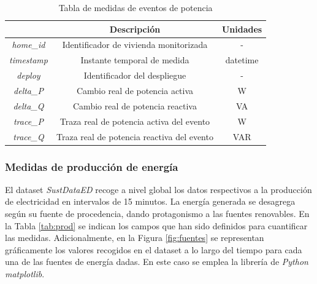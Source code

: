 \vspace{3mm}

\begin{table}[h!]
    \centering
    \begin{tabular}{|c|c|c|}
    \hline
    \rowcolor[HTML]{AAAAAA} 
    \multicolumn{1}{|c|}{\cellcolor[HTML]{AAAAAA}Campo} & \multicolumn{1}{c|}{\cellcolor[HTML]{AAAAAA}Descripción} & Unidades \\ \hline
    \textit{home\_id} & Identificador de vivienda monitorizada & - \\ \hline
    \textit{timestamp} & Instante temporal de medida & datetime \\ \hline
    \textit{deploy} & Identificador del despliegue & - \\ \hline
    \textit{delta\_P} & Cambio real de potencia activa & W \\ \hline
    \textit{delta\_Q} & Cambio real de potencia reactiva & VA \\ \hline
    \textit{trace\_P} & Traza real de potencia activa del evento & W \\ \hline
    \textit{trace\_Q} & Traza real de potencia reactiva del evento & VAR \\ \hline
    \end{tabular}
    \caption{Tabla de medidas de eventos de potencia \cite{sustdata}}
    \label{tab:eventos}
\end{table}

\subsubsection{Medidas de producción de energía}
\label{sec:prodsustdata}

El dataset \textit{SustDataED} recoge a nivel global los datos respectivos a la producción de electricidad en intervalos de 15 minutos. La energía generada se desagrega según su fuente de procedencia, dando protagonismo a las fuentes renovables. En la Tabla \ref{tab:prod} se indican los campos que han sido definidos para cuantificar las medidas. Adicionalmente, en la Figura \ref{fig:fuentes} se representan gráficamente los valores recogidos en el dataset a lo largo del tiempo para cada una de las fuentes de energía dadas. En este caso se emplea la librería de \textit{Python} \textit{matplotlib}.

\vspace{3mm}

